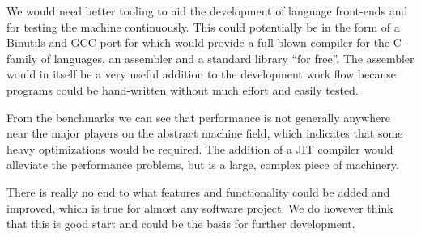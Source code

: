We would need better tooling to aid the development of language front-ends and
for testing the machine continuously. This could potentially be in the form of a
Binutils and GCC port for \thename{} which would provide a full-blown compiler
for the C-family of languages, an assembler and a standard library ``for
free''. The assembler would in itself be a very useful addition to the
development work flow because programs could be hand-written without much effort
and easily tested.

From the benchmarks we can see that performance is not generally anywhere near
the major players on the abstract machine field, which indicates that some heavy
optimizations would be required. The addition of a JIT compiler would alleviate
the performance problems, but is a large, complex piece of machinery.

There is really no end to what features and functionality could be added and
improved, which is true for almost any software project. We do however think
that this is good start and could be the basis for further development.

